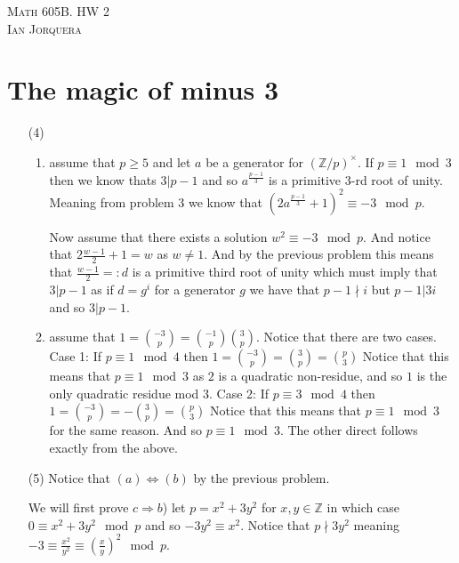 \documentclass[12pt]{amsart}
\theoremstyle{definition}
\newcommand{\Z}{\mathbb{Z}}
\begin{document}
\begin{center}
    \textsc{Math 605B. HW 2\\ Ian Jorquera}
\end{center}
\vspace{1em}

\section*{The magic of minus 3}
\begin{itemize}
\item[(4)]
\begin{enumerate}[label=(\alph*)]
    \item assume that $p\geq 5$ and let $a$ be a generator for $(\Z/p)^\times$. If $p\equiv 1 \mod 3$ then we know thats $3|p-1$ and so $a^{\frac{p-1}{3}}$ is a primitive $3$-rd root of unity. Meaning from problem 3 we know that $(2a^{\frac{p-1}{3}}+1)^2\equiv-3\mod p$. %

    Now assume that there exists a solution $w^2\equiv -3\mod p$. And notice that $2\frac{w-1}{2}+1=w$ as $w\neq 1$. And by the previous problem this means that $\frac{w-1}{2}=:d$ is a primitive third root of unity which must imply that $3|p-1$ as if $d=g^i$ for a generator $g$ we have that $p-1\nmid i$ but $p-1|3i$ and so $3|p-1$.

    \item assume that $1={-3 \choose p}={-1 \choose p}{3 \choose p}$. Notice that there are two cases. Case 1: If $p\equiv 1 \mod 4$ then $1={-3 \choose p}={3 \choose p}={p\choose 3}$ Notice that this means that $p\equiv 1 \mod 3$ as $2$ is a quadratic non-residue, and so $1$ is the only quadratic residue mod $3$. Case 2: If $p\equiv 3 \mod 4$ then $1={-3 \choose p}=-{3 \choose p}={p\choose 3}$ Notice that this means that $p\equiv 1 \mod 3$ for the same reason. And so $p\equiv 1 \mod 3$. The other direct follows exactly from the above.\\ %
\end{enumerate}

\item[(5)] Notice that $(a)\Leftrightarrow (b)$ by the previous problem. 

We will first prove $c\Rightarrow b$) let $p=x^2+3y^2$ for $x,y\in\Z$ in which case $0\equiv x^2+3y^2 \mod p$ and so $-3y^2\equiv x^2$. Notice that $p\nmid 3y^2$ meaning $-3\equiv \frac{x^2}{y^2}\equiv (\frac{x}{y})^2 \mod p$. 


\end{itemize}
\end{document}
